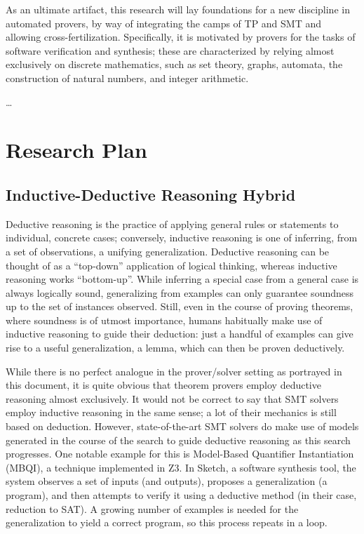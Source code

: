 As an ultimate artifact, this research will lay foundations for a new discipline
in automated provers, by way of integrating the camps of TP and SMT and allowing
cross-fertilization.
Specifically, it is motivated by provers for the tasks of software verification
and synthesis; these are characterized by relying almost exclusively on discrete
mathematics, such as set theory, graphs, automata, the construction of
natural numbers, and integer arithmetic.

\ldots


\section{Research Plan}

\subsection{Inductive-Deductive Reasoning Hybrid}

Deductive reasoning is the practice of applying general rules or statements to
individual, concrete cases; conversely, inductive reasoning is one of inferring,
from a set of observations, a unifying generalization.
Deductive reasoning can be thought of as a ``top-down'' application of logical
thinking, whereas inductive reasoning works ``bottom-up''.
While inferring a special case from a general case is always logically sound,
generalizing from examples can only guarantee soundness up to the set of
instances observed.
Still, even in the course of proving theorems, where soundness is of utmost
importance, humans habitually make use of inductive reasoning to guide their
deduction:
just a handful of examples can give rise to a useful generalization, a lemma,
which can then be proven deductively.

While there is no perfect analogue in the prover/solver setting as portrayed
in this document, it is quite obvious that theorem provers employ deductive
reasoning almost exclusively.
It would not be correct to say that SMT solvers employ inductive reasoning in
the same sense; a lot of their mechanics is still based on deduction.
However, state-of-the-art SMT solvers do make use of models generated in the
course of the search to guide deductive reasoning as this search progresses.
One notable example for this is Model-Based Quantifier Instantiation (MBQI),
a technique implemented in Z3.
In Sketch, a software synthesis tool, the system observes a set of inputs (and
outputs), proposes a generalization (a program), and then attempts to verify it
using a deductive method (in their case, reduction to SAT).
A growing number of examples is needed for the generalization to yield a correct
program, so this process repeats in a loop.

